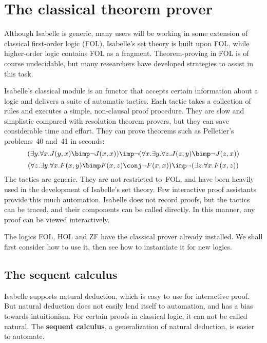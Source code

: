 \chapter{The classical theorem prover}
\newcommand\ainfer[2]{\begin{array}{r@{}l}#2\\ \hline#1\end{array}}
Although Isabelle is generic, many users will be working in some extension
of classical first-order logic (FOL).  Isabelle's set theory is built upon
FOL, while higher-order logic contains FOL as a fragment.  Theorem-proving
in FOL is of course undecidable, but many researchers have developed
strategies to assist in this task.

Isabelle's classical module is an \ML{} functor that accepts certain
information about a logic and delivers a suite of automatic tactics.  Each
tactic takes a collection of rules and executes a simple, non-clausal proof
procedure.  They are slow and simplistic compared with resolution theorem
provers, but they can save considerable time and effort.  They can prove
theorems such as Pelletier's~\cite{pelletier86} problems~40 and~41 in
seconds:
\[ (\exists y. \forall x. J(y,x) \bimp \neg J(x,x))  
   \imp  \neg (\forall x. \exists y. \forall z. J(z,y) \bimp \neg J(z,x)) \]
\[ (\forall z. \exists y. \forall x. F(x,y) \bimp F(x,z) \conj \neg F(x,x))
   \imp \neg (\exists z. \forall x. F(x,z))  
\]
The tactics are generic.  They are not restricted to~FOL, and have been
heavily used in the development of Isabelle's set theory.  Few interactive
proof assistants provide this much automation.  Isabelle does not record
proofs, but the tactics can be traced, and their components can be called
directly.  In this manner, any proof can be viewed interactively.

The logics FOL, HOL and ZF have the classical prover already installed.  We
shall first consider how to use it, then see how to instantiate it for new
logics. 


\section{The sequent calculus}
Isabelle supports natural deduction, which is easy to use for interactive
proof.  But natural deduction does not easily lend itself to automation,
and has a bias towards intuitionism.  For certain proofs in classical
logic, it can not be called natural.  The {\bf sequent calculus}, a
generalization of natural deduction, is easier to automate.

